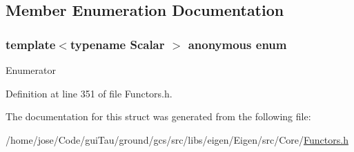 \subsection{Member Enumeration Documentation}
\hypertarget{structei__functor__traits_3_01ei__scalar__constant__op_3_01_scalar_01_4_01_4_af551cbbc432f4cc536be63901f25a450}{\subsubsection[{anonymous enum}]{\setlength{\rightskip}{0pt plus 5cm}template$<$typename Scalar $>$ anonymous enum}}\label{structei__functor__traits_3_01ei__scalar__constant__op_3_01_scalar_01_4_01_4_af551cbbc432f4cc536be63901f25a450}
\begin{Desc}
\item[Enumerator]\par
\begin{description}
\item[{\em 
\hypertarget{structei__functor__traits_3_01ei__scalar__constant__op_3_01_scalar_01_4_01_4_af551cbbc432f4cc536be63901f25a450a6f6f4698f7d9c1d804e6e3a479cad172}{Cost}\label{structei__functor__traits_3_01ei__scalar__constant__op_3_01_scalar_01_4_01_4_af551cbbc432f4cc536be63901f25a450a6f6f4698f7d9c1d804e6e3a479cad172}
}]\end{description}
\end{Desc}


Definition at line 351 of file Functors.\-h.



The documentation for this struct was generated from the following file\-:\begin{DoxyCompactItemize}
\item 
/home/jose/\-Code/gui\-Tau/ground/gcs/src/libs/eigen/\-Eigen/src/\-Core/\hyperlink{_core_2_functors_8h}{Functors.\-h}\end{DoxyCompactItemize}
